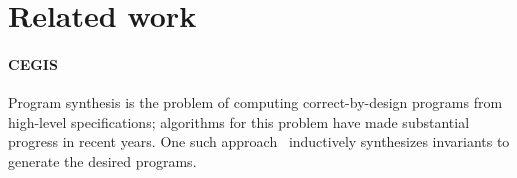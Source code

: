 \documentclass[runningheads,a4paper]{llncs}
\begin{document}


%





\section{Related work}
\label{sec:relw}

\paragraph{CEGIS}

Program synthesis is the problem of computing correct-by-design programs
from high-level specifications; algorithms for this problem have made
substantial progress in recent years.  One such
approach~\cite{itzhaky2010simple} inductively synthesizes invariants to
generate the desired programs.
\end{document}
